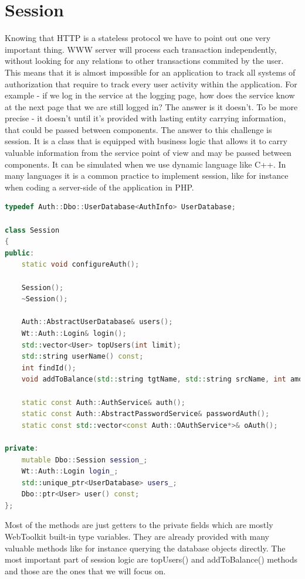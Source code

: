 \documentclass[a4paper,12pt]{book}
\begin{document}
\section{Session}
{
Knowing that HTTP is a stateless protocol we have to point out one very important thing. WWW server will process each transaction independently, without looking for any relations to other transactions commited by the user. This means that it is almost impossible for an application to track all systems of authorization that require to track every user activity within the application. For example - if we log in the service at the logging page, how does the service know at the next page that we are still logged in? The answer is it doesn't. To be more precise - it doesn't until it's provided with lasting entity carrying information, that could be passed between components. The answer to this challenge is session. It is a class that is equipped with business logic that allows it to carry valuable information from the service point of view and may be passed between components. It can be simulated when we use dynamic language like C++. In many languages it is a common practice to implement session, like for instance when coding a server-side of the application in PHP. 

\bigskip
\begin{lstlisting}[frame=single, basicstyle=\small, language=C++, caption={Session.h file.}, captionpos=b]
typedef Auth::Dbo::UserDatabase<AuthInfo> UserDatabase;

class Session
{
public:
	static void configureAuth();

	Session();
	~Session();

	Auth::AbstractUserDatabase& users();
	Wt::Auth::Login& login();
	std::vector<User> topUsers(int limit);
	std::string userName() const;
	int findId();
	void addToBalance(std::string tgtName, std::string srcName, int amount);

	static const Auth::AuthService& auth();
	static const Auth::AbstractPasswordService& passwordAuth();
	static const std::vector<const Auth::OAuthService*>& oAuth();

private:
	mutable Dbo::Session session_;
	Wt::Auth::Login login_;
	std::unique_ptr<UserDatabase> users_;
	Dbo::ptr<User> user() const;
};
\end{lstlisting}

Most of the methods are just getters to the private fields which are mostly WebToolkit built-in type variables. They are already provided with many valuable methods like for instance querying the database objects directly. The most important part of session logic are topUsers() and addToBalance() methods and those are the ones that we will focus on. 

}
\end{document}
